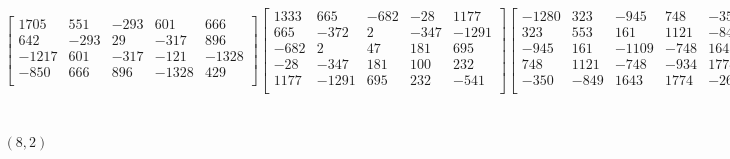 \documentclass[12pt]{amsart}
\theoremstyle{plain}
\theoremstyle{definition}
\begin{document}
\begin{landscape}
\begin{align*}
\begin{bmatrix}
 1705  &   551  &   -293  &   601  &   666  \\ 
 642  &   -293  &   29  &   -317  &   896  \\ 
 -1217  &   601  &   -317  &   -121  &   -1328  \\ 
 -850  &   666  &   896  &   -1328  &   429  \\ 
\end{bmatrix}
\begin{bmatrix}
1333  &   665  &   -682  &   -28  &   1177  \\ 
 665  &   -372  &   2  &   -347  &   -1291  \\ 
 -682  &   2  &   47  &   181  &   695  \\ 
 -28  &   -347  &   181  &   100  &   232  \\ 
 1177  &   -1291  &   695  &   232  &   -541  \\ 
\end{bmatrix}
\begin{bmatrix}
-1280  &   323  &   -945  &   748  &   -350  \\ 
 323  &   553  &   161  &   1121  &   -849  \\ 
 -945  &   161  &   -1109  &   -748  &   1643  \\ 
 748  &   1121  &   -748  &   -934  &   1774  \\ 
 -350  &   -849  &   1643  &   1774  &   -2608  \\ 
\end{bmatrix}
\begin{bmatrix}
1  &   0  &   0  &   0  &   0  \\ 
 0  &   1  &   0  &   0  &   0  \\ 
 0  &   0  &   1  &   0  &   0  \\ 
 0  &   0  &   0  &   1  &   0  \\ 
 0  &   0  &   0  &   0  &   1  \\ 
\end{bmatrix}
\\
(8,2) &:
\begin{bmatrix}
-472  &   3370  &   -2386  &   -2378  &   -2682  \\ 
 3370  &   3520  &   -1998  &   3841  &   -2020  \\ 
 -2386  &   -1998  &   972  &   -913  &   -3227  \\ 
 -2378  &   3841  &   -913  &   -9088  &   2395  \\ 
 -2682  &   -2020  &   -3227  &   2395  &   -5612  \\ 
\end{bmatrix}

\end{align*}
\end{landscape}
\end{document}
